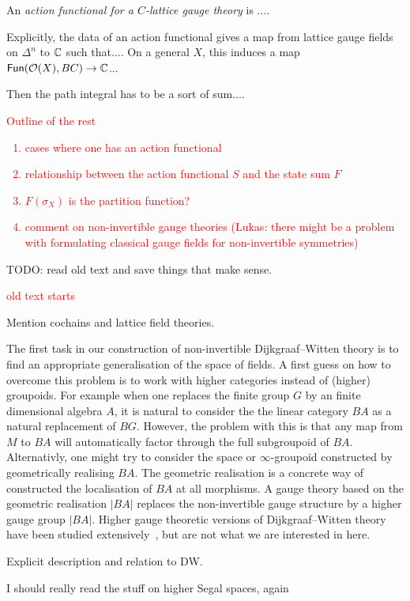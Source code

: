 \begin{definition}
    An \emph{action functional for a $C$-lattice gauge theory} is ....
\end{definition}

Explicitly, the data of an action functional gives a map from lattice gauge fields on $\Delta^n$ to $\mathbb{C}$ such that....
On a general $X$, this induces a map $\mathsf{Fun}(\mathcal{O}(X), BC) \to \mathbb{C}$...

Then the path integral has to be a sort of sum....

\textcolor{red}{
Outline of the rest
\begin{enumerate}
    \item cases where one has an action functional
    \item relationship between the action functional $S$ and the state sum $F$ 
    \item $F(\sigma_X)$ is the partition function?
    \item comment on non-invertible gauge theories (Lukas: there might be a problem with formulating classical gauge fields for non-invertible symmetries)
\end{enumerate}}



TODO: read old text and save things that make sense.

\textcolor{red}{old text starts}

\color{red} Mention cochains and lattice field theories. \color{black}

The first task in our construction of non-invertible Dijkgraaf--Witten theory
is to find an appropriate generalisation of the space of fields. A first guess
on how to overcome this problem is to work with higher categories instead of
(higher) groupoids. For example when one replaces the finite group $G$ by an
finite dimensional algebra $A$, it is natural to consider the the linear category
$BA$ as a natural replacement of $BG$. However, the problem with this is
that any map from $M$ to $BA$ will automatically factor through the full
subgroupoid of $BA$. Alternativly, one might try to consider the space or
$\infty$-groupoid constructed by geometrically realising $BA$. The geometric
realisation is a concrete way of constructed the localisation of $BA$ at all
morphisms. A gauge theory based on the geometric realisation $|BA|$ replaces the
non-invertible gauge structure by a higher gauge group $|BA|$. Higher gauge
theoretic versions of Dijkgraaf--Witten theory have been studied
extensively~\cite{some thing}, but are not what we are interested in here.



\color{red}
Explicit description and relation to DW.

I should really read the stuff on higher Segal spaces, again \color{black}
